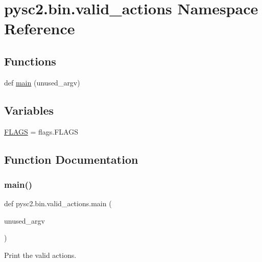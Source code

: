 \hypertarget{namespacepysc2_1_1bin_1_1valid__actions}{}\section{pysc2.\+bin.\+valid\+\_\+actions Namespace Reference}
\label{namespacepysc2_1_1bin_1_1valid__actions}
\subsection*{Functions}
\begin{DoxyCompactItemize}
\item 
def \mbox{\hyperlink{namespacepysc2_1_1bin_1_1valid__actions_adf8e7682a43cff343fda9fb40b8dcc07}{main}} (unused\+\_\+argv)
\end{DoxyCompactItemize}
\subsection*{Variables}
\begin{DoxyCompactItemize}
\item 
\mbox{\hyperlink{namespacepysc2_1_1bin_1_1valid__actions_a5cb3ccb2295ab0ecbf9ddd8f0f4489af}{F\+L\+A\+GS}} = flags.\+F\+L\+A\+GS
\end{DoxyCompactItemize}


\subsection{Function Documentation}
\mbox{\label{namespacepysc2_1_1bin_1_1valid__actions_adf8e7682a43cff343fda9fb40b8dcc07}} 
\subsubsection{\texorpdfstring{main()}{main()}}
{\footnotesize\ttfamily def pysc2.\+bin.\+valid\+\_\+actions.\+main (\begin{DoxyParamCaption}\item[{}]{unused\+\_\+argv }\end{DoxyParamCaption})}

\begin{DoxyVerb}Print the valid actions.\end{DoxyVerb}
 

